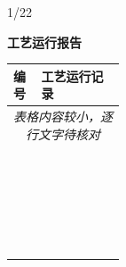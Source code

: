 \documentclass[UTF8,10pt,a4paper,fontset=fandol]{ctexart}
\newcommand{\handwritten}[1]{#1}
\begin{document}
\begin{minipage}[t]{0.48\textwidth}
\handwritten{1/22}
\end{minipage}


\newpage

\begin{center}
\begin{minipage}[t]{0.47\textwidth}
\centering
\textbf{工艺运行报告}

\vspace{0.3em}
\scriptsize
\begin{tabularx}{\linewidth}{|p{0.25\linewidth}|X|}
\hline
编号 & 工艺运行记录 \\
\hline
\multicolumn{2}{|c|}{\textit{表格内容较小，逐行文字待核对}}\\
\hline
\multicolumn{2}{|c|}{}\\
\hline
\multicolumn{2}{|c|}{}\\
\hline
\multicolumn{2}{|c|}{}\\
\hline
\multicolumn{2}{|c|}{}\\
\hline
\multicolumn{2}{|c|}{}\\
\hline
\multicolumn{2}{|c|}{}\\
\hline
\multicolumn{2}{|c|}{}\\
\hline
\multicolumn{2}{|c|}{}\\
\hline
\multicolumn{2}{|c|}{}\\
\hline
\multicolumn{2}{|c|}{}\\
\hline
\multicolumn{2}{|c|}{}\\
\hline
\multicolumn{2}{|c|}{}\\
\hline
\multicolumn{2}{|c|}{}\\
\hline
\multicolumn{2}{|c|}{}\\
\hline
\multicolumn{2}{|c|}{}\\
\hline
\multicolumn{2}{|c|}{}\\
\hline
\multicolumn{2}{|c|}{}\\
\hline
\multicolumn{2}{|c|}{}\\
\hline
\multicolumn{2}{|c|}{}\\
\hline
\multicolumn{2}{|c|}{}\\
\hline
\multicolumn{2}{|c|}{}\\
\hline
\multicolumn{2}{|c|}{}\\
\hline
\multicolumn{2}{|c|}{}\\
\hline
\multicolumn{2}{|c|}{}\\
\hline
\end{tabularx}


\end{minipage}
\end{center}
\end{document}
